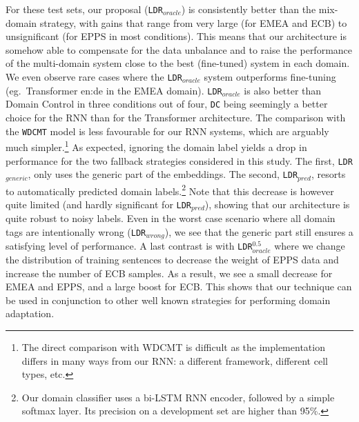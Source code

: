 \documentclass[11pt,a4paper]{article}
\newcommand{\fyTodo}[1]{\Todo[FY:]{\textcolor{orange}{#1}}}
\newcommand{\fyDone}[1]{\done[FY]\Todo[FY:]{\textcolor{orange}{#1}}}
\begin{document}
For these test sets, our proposal (\texttt{LDR}$_{oracle}$) is consistently better than the mix-domain strategy, with gains that range from very large (for EMEA and ECB) to unsignificant (for EPPS in most conditions). This means that our architecture is somehow able to compensate for the data unbalance and to raise the performance of the multi-domain system close to the best (fine-tuned) system in each domain. We even observe rare cases where the \texttt{LDR}$_{oracle}$ system outperforms fine-tuning (eg.\ Transformer en:de in the EMEA domain). \texttt{LDR}$_{oracle}$ is also better than Domain Control in three conditions out of four, \texttt{DC} being seemingly a better choice for the RNN than for the Transformer architecture. The comparison with the \texttt{WDCMT} model is less favourable for our RNN systems, which are arguably much simpler.\footnote{The direct comparison with WDCMT is difficult as the implementation differs in many ways from our RNN: a different framework, different cell types,
  etc.} \fyDone{More on this.}
As expected, ignoring the domain label yields a drop in performance for the two fallback strategies considered in this study. The first, \texttt{LDR}$_{generic}$, only uses the generic part of the embeddings. The second, \texttt{LDR}$_{pred}$, resorts to automatically predicted domain labels.\footnote{Our domain classifier uses a bi-LSTM RNN encoder, followed by a simple softmax layer. Its precision on a development set are higher than 95\%.}
Note that this decrease is however quite limited (and hardly significant for \texttt{LDR}$_{pred}$), showing that our architecture is quite robust to noisy labels. Even in the worst case scenario where all domain tags are intentionally wrong (\texttt{LDR}$_{wrong}$), we see that the generic part still ensures a satisfying level of performance. A last contrast is with \texttt{LDR}$_{oracle}^{0.5}$ where we change the distribution of training sentences to decrease the weight of EPPS data and increase the number of ECB samples. As a result, we see a small decrease for EMEA and EPPS, and a large boost for ECB. This shows that our technique can be used in conjunction to other well known strategies for performing domain adaptation. 

\end{document}
